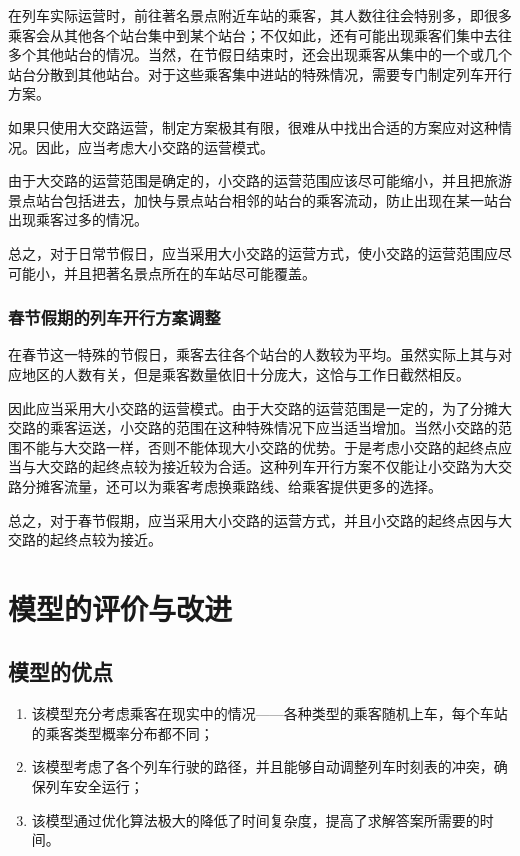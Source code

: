在列车实际运营时，前往著名景点附近车站的乘客，其人数往往会特别多，即很多乘客会从其他各个站台集中到某个站台；不仅如此，还有可能出现乘客们集中去往多个其他站台的情况。当然，在节假日结束时，还会出现乘客从集中的一个或几个站台分散到其他站台。对于这些乘客集中进站的特殊情况，需要专门制定列车开行方案。

如果只使用大交路运营，制定方案极其有限，很难从中找出合适的方案应对这种情况。因此，应当考虑大小交路的运营模式。

由于大交路的运营范围是确定的，小交路的运营范围应该尽可能缩小，并且把旅游景点站台包括进去，加快与景点站台相邻的站台的乘客流动，防止出现在某一站台出现乘客过多的情况。

总之，对于日常节假日，应当采用大小交路的运营方式，使小交路的运营范围应尽可能小，并且把著名景点所在的车站尽可能覆盖。

\subsubsection{春节假期的列车开行方案调整}

在春节这一特殊的节假日，乘客去往各个站台的人数较为平均。虽然实际上其与对应地区的人数有关，但是乘客数量依旧十分庞大，这恰与工作日截然相反。

因此应当采用大小交路的运营模式。由于大交路的运营范围是一定的，为了分摊大交路的乘客运送，小交路的范围在这种特殊情况下应当适当增加。当然小交路的范围不能与大交路一样，否则不能体现大小交路的优势。于是考虑小交路的起终点应当与大交路的起终点较为接近较为合适。这种列车开行方案不仅能让小交路为大交路分摊客流量，还可以为乘客考虑换乘路线、给乘客提供更多的选择。

总之，对于春节假期，应当采用大小交路的运营方式，并且小交路的起终点因与大交路的起终点较为接近。


%
%

\section{模型的评价与改进}

\subsection{模型的优点}

\begin{enumerate}
    \item 该模型充分考虑乘客在现实中的情况——各种类型的乘客随机上车，每个车站的乘客类型概率分布都不同；
    \item 该模型考虑了各个列车行驶的路径，并且能够自动调整列车时刻表的冲突，确保列车安全运行；
    \item 该模型通过优化算法极大的降低了时间复杂度，提高了求解答案所需要的时间。
\end{enumerate}

